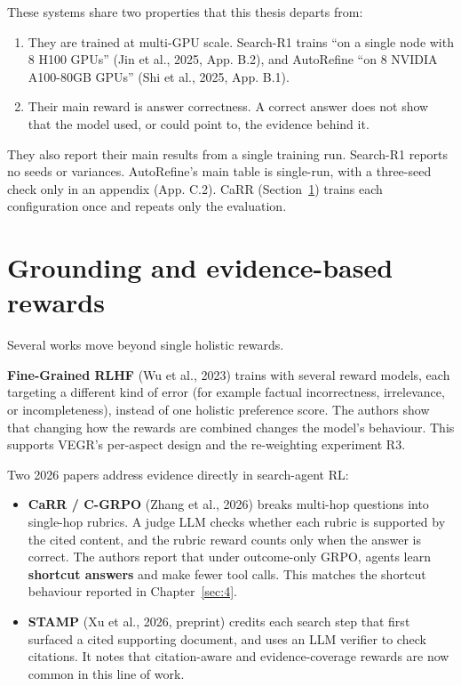 These systems share two properties that this thesis departs from:

\begin{enumerate}
\def\labelenumi{\arabic{enumi}.}
\tightlist
\item
  They are trained at multi-GPU scale. Search-R1 trains ``on a single
  node with 8 H100 GPUs'' (Jin et al., 2025, App. B.2), and AutoRefine
  ``on 8 NVIDIA A100-80GB GPUs'' (Shi et al., 2025, App. B.1).
\item
  Their main reward is answer correctness. A correct answer does not
  show that the model used, or could point to, the evidence behind it.
\end{enumerate}

They also report their main results from a single training run.
Search-R1 reports no seeds or variances. AutoRefine's main table is
single-run, with a three-seed check only in an appendix (App. C.2). CaRR
(Section~\ref{sec:2.7}) trains each configuration once and repeats only
the evaluation.

\section{Grounding and evidence-based rewards}\label{sec:2.7}

Several works move beyond single holistic rewards.

\textbf{Fine-Grained RLHF} (Wu et al., 2023) trains with several reward
models, each targeting a different kind of error (for example factual
incorrectness, irrelevance, or incompleteness), instead of one holistic
preference score. The authors show that changing how the rewards are
combined changes the model's behaviour. This supports VEGR's per-aspect
design and the re-weighting experiment R3.

Two 2026 papers address evidence directly in search-agent RL:

\begin{itemize}
\tightlist
\item
  \textbf{CaRR / C-GRPO} (Zhang et al., 2026) breaks multi-hop questions
  into single-hop rubrics. A judge LLM checks whether each rubric is
  supported by the cited content, and the rubric reward counts only when
  the answer is correct. The authors report that under outcome-only
  GRPO, agents learn \textbf{shortcut answers} and make fewer tool
  calls. This matches the shortcut behaviour reported in
  Chapter~\ref{sec:4}.
\item
  \textbf{STAMP} (Xu et al., 2026, preprint) credits each search step
  that first surfaced a cited supporting document, and uses an LLM
  verifier to check citations. It notes that citation-aware and
  evidence-coverage rewards are now common in this line of work.
\end{itemize}

